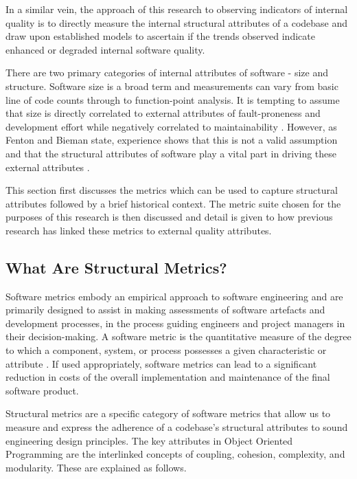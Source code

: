 In a similar vein, the approach of this research to observing indicators of internal quality is to directly measure the internal structural attributes of a codebase and draw upon established models to ascertain if the trends observed indicate enhanced or degraded internal software quality.

There are two primary categories of internal attributes of software - size and structure. Software size is a broad term and measurements can vary from basic line of code counts through to function-point analysis. It is tempting to assume that size is directly correlated to external attributes of fault-proneness and development effort while negatively correlated to maintainability \citep{akiyama1971example}. However, as Fenton and Bieman state, experience shows that this is not a valid assumption and that the structural attributes of software play a vital part in driving these external attributes \citep{fenton2014software}.
 
This section first discusses the metrics which can be used to capture structural attributes followed by a brief historical context. The metric suite chosen for the purposes of this research is then discussed and detail is given to how previous research has linked these metrics to external quality attributes.

\subsection{What Are Structural Metrics?}
Software metrics embody an empirical approach to software engineering and are primarily designed to assist in making assessments of software artefacts and development processes, in the process guiding engineers and project managers in their decision-making. A software metric is the quantitative measure of the degree to which a component, system, or process possesses a given characteristic or attribute \citep{ordonez2008state}. If used appropriately, software metrics can lead to a significant reduction in costs of the overall implementation and maintenance of the final software product. 

Structural metrics are a specific category of software metrics that allow us to measure and express the adherence of a codebase's structural attributes to sound engineering design principles. The key attributes in Object Oriented Programming are the interlinked concepts of coupling, cohesion, complexity, and modularity. These are explained as follows.


